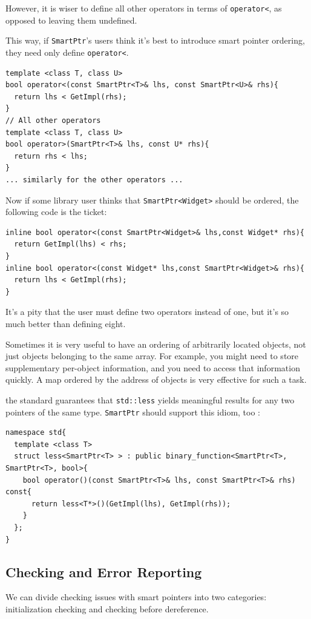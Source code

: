  However, it is wiser to define all other operators in terms of
 \texttt{operator<}, as opposed to leaving them undefined.

 This way, if \texttt{SmartPtr}'s users think it's best to introduce smart
 pointer ordering, they need only define \texttt{operator<}.
\begin{verbatim}
template <class T, class U>
bool operator<(const SmartPtr<T>& lhs, const SmartPtr<U>& rhs){ 
  return lhs < GetImpl(rhs); 
}
// All other operators
template <class T, class U>
bool operator>(SmartPtr<T>& lhs, const U* rhs){ 
  return rhs < lhs; 
}
... similarly for the other operators ...
\end{verbatim}

Now if some library user thinks that \texttt{SmartPtr<Widget>} should
be ordered, the following code is the ticket:
\begin{verbatim}
inline bool operator<(const SmartPtr<Widget>& lhs,const Widget* rhs){
  return GetImpl(lhs) < rhs;
}
inline bool operator<(const Widget* lhs,const SmartPtr<Widget>& rhs){
  return lhs < GetImpl(rhs);
}
\end{verbatim}
It's a pity that the user must define two operators instead of one,
but it's so much better than defining eight.

 Sometimes it is very useful to have an ordering of arbitrarily
 located objects, not just objects belonging to the same array. For
 example, you might need to store supplementary per-object
 information, and you need to access that information 
quickly. A map ordered by the address of objects is very effective for
such a task.

 the standard guarantees that \texttt{std::less} yields meaningful
 results for any two pointers of the same type. \texttt{SmartPtr}
 should support this idiom, too :
\begin{verbatim}
namespace std{
  template <class T>
  struct less<SmartPtr<T> > : public binary_function<SmartPtr<T>, SmartPtr<T>, bool>{
    bool operator()(const SmartPtr<T>& lhs, const SmartPtr<T>& rhs) const{
      return less<T*>()(GetImpl(lhs), GetImpl(rhs));
    }
  };
}
\end{verbatim}

 \subsection{Checking and Error Reporting}

 We can divide checking issues with smart pointers into two
 categories: initialization checking and checking before dereference.


